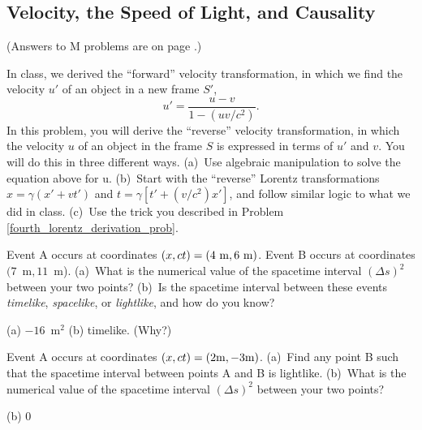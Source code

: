 \subsection{Velocity, the Speed of Light, and Causality} 

(Answers to M problems are on page \pageref{velocities_causality_prob_answers}.)


\begin{Exercise}[difficulty=0]
In class, we derived the ``forward'' velocity transformation, in which we find the velocity $u'$ of an object in a new frame $S'$,
$$
u'=\frac{u-v}{1-({uv}/{c^2})}.
$$
In this problem, you will derive the ``reverse'' velocity transformation, in which the velocity $u$ of an object in the frame $S$ is expressed in terms of $u'$ and $v$.  You will do this in three different ways. (a)~Use algebraic manipulation to solve the equation above for u. (b)~Start with the ``reverse'' Lorentz transformations $x=\gamma(x'+vt')$ and $t=\gamma[t'+(v/c^2 )x']$, and follow similar logic to what we did in class.  (c)~Use the trick you described in Problem \ref{fourth_lorentz_derivation_prob}.
\end{Exercise}


\begin{Exercise}[difficulty=1]
Event A occurs at coordinates $(x,ct)=(4~{\rm m},6~{\rm m})$.  Event B occurs at coordinates $(7$~m$,11$~m). (a)~What is the numerical value of the spacetime interval $(\Delta s)^2$ between your two points?  (b)~Is the spacetime interval between these events \textit{timelike}, \textit{spacelike}, or \textit{lightlike}, and how do you know?  
\end{Exercise}
\begin{Answer}
(a) $-16$~m$^2$  (b) timelike.  (Why?) 
\end{Answer}


\begin{Exercise}[difficulty=1]
Event A occurs at coordinates $(x,ct)=(2 {\rm m},-3 {\rm m})$.  (a)~Find any point B such that the spacetime interval between points A and B is lightlike.  (b)~What is the numerical value of the spacetime interval $(\Delta s)^2$ between your two points?
\end{Exercise}
\begin{Answer}
(b) 0
\end{Answer}


